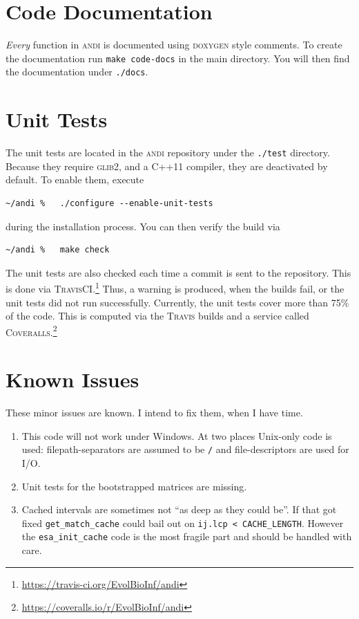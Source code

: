 \documentclass[a4paper,
  10pt,
  english,
  DIV=12,
  BCOR=8mm]{scrbook}
\newcommand{\algo}[1]{\textsc{{#1}}}
\newcommand{\andi}{\algo{andi}\xspace}
\begin{document}
\section{Code Documentation}

\emph{Every} function in \andi is documented using \algo{doxygen} style comments. To create the documentation run \lstinline$make code-docs$ in the main directory. You will then find the documentation under \lstinline$./docs$.


\section{Unit Tests}

The unit tests are located in the \andi repository under the \lstinline$./test$ directory. Because they require \algo{glib2}, and a C++11 compiler, they are deactivated by default. To enable them, execute

\begin{lstlisting}
~/andi %   ./configure --enable-unit-tests
\end{lstlisting}

\noindent during the installation process. You can then verify the build via 

\begin{lstlisting}
~/andi %   make check
\end{lstlisting}

\noindent The unit tests are also checked each time a commit is sent to the repository. This is done via \algo{TravisCI}.\footnote{\url{https://travis-ci.org/EvolBioInf/andi}} Thus, a warning is produced, when the builds fail, or the unit tests did not run successfully. Currently, the unit tests cover more than 75\% of the code. This is computed via the \algo{Travis} builds and a service called \algo{Coveralls}.\footnote{\url{https://coveralls.io/r/EvolBioInf/andi}}

\section{Known Issues}

These minor issues are known. I intend to fix them, when I have time.

\begin{enumerate}
  \item This code will not work under Windows. At two places Unix-only code is used: filepath-separators are assumed to be \lstinline$/$ and file-descriptors are used for I/O.
  \item Unit tests for the bootstrapped matrices are missing.
  \item Cached intervals are sometimes not “as deep as they could be”. If that got fixed \lstinline$get_match_cache$ could bail out on \lstinline$ij.lcp < CACHE_LENGTH$. However the \lstinline$esa_init_cache$ code is the most fragile part and should be handled with care.
\end{enumerate}
\end{document}
